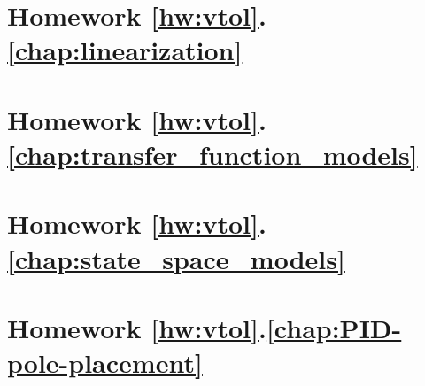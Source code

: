 	\section*{
		Homework \ref{hw:vtol}.\ref{chap:linearization}}  
		\label{hw:vtol_linearization}
		
	\section*{
		Homework \ref{hw:vtol}.\ref{chap:transfer_function_models}}  
		\label{hw:vtol_transfer_function}
		
	\section*{
		Homework \ref{hw:vtol}.\ref{chap:state_space_models}}  
		\label{hw:vtol_state_space}
		
	\section*{
		Homework \ref{hw:vtol}.\ref{chap:PID-pole-placement}}  
		\label{hw:vtol_pd_pole_placement}
		

